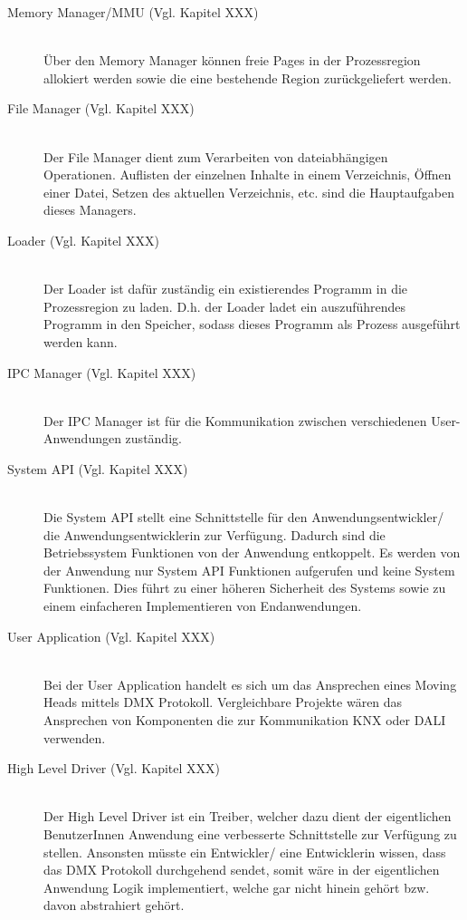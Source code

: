 \begin{description}
	\item[Memory Manager/MMU (Vgl. Kapitel XXX)] \hfill \\
	Über den Memory Manager können freie Pages in der Prozessregion allokiert werden sowie die eine bestehende Region zurückgeliefert werden. \\

	\item[File Manager (Vgl. Kapitel XXX)] \hfill \\
	Der File Manager dient zum Verarbeiten von dateiabhängigen Operationen. Auflisten der einzelnen Inhalte in einem Verzeichnis, Öffnen einer Datei, Setzen des aktuellen Verzeichnis, etc. sind die Hauptaufgaben dieses Managers.
	
	\item[Loader (Vgl. Kapitel XXX)] \hfill \\
	Der Loader ist dafür zuständig ein existierendes Programm in die Prozessregion zu laden. D.h. der Loader ladet ein auszuführendes Programm in den Speicher, sodass dieses Programm als Prozess ausgeführt werden kann.
	
	\item[IPC Manager (Vgl. Kapitel XXX)] \hfill \\
	Der IPC Manager ist für die Kommunikation zwischen verschiedenen User-Anwendungen zuständig.
	
	\item[System API (Vgl. Kapitel XXX)] \hfill \\
	Die System API stellt eine Schnittstelle für den Anwendungsentwickler/ die Anwendungsentwicklerin zur Verfügung. Dadurch sind die Betriebssystem Funktionen von der Anwendung entkoppelt. Es werden von der Anwendung nur System API Funktionen aufgerufen und keine System Funktionen. Dies führt zu einer höheren Sicherheit des Systems sowie zu einem einfacheren Implementieren von Endanwendungen.
	
	\item[User Application (Vgl. Kapitel XXX)] \hfill \\
	Bei der User Application handelt es sich um das Ansprechen eines Moving Heads mittels DMX Protokoll. Vergleichbare Projekte wären das Ansprechen von Komponenten die zur Kommunikation KNX oder DALI verwenden.
	
	\item[High Level Driver (Vgl. Kapitel XXX)] \hfill \\
	Der High Level Driver ist ein Treiber, welcher dazu dient der eigentlichen BenutzerInnen Anwendung eine verbesserte Schnittstelle zur Verfügung zu stellen. Ansonsten müsste ein Entwickler/ eine Entwicklerin wissen, dass das DMX Protokoll durchgehend sendet, somit wäre in der eigentlichen Anwendung Logik implementiert, welche gar nicht hinein gehört bzw. davon abstrahiert gehört.
\end{description}

\pagebreak 